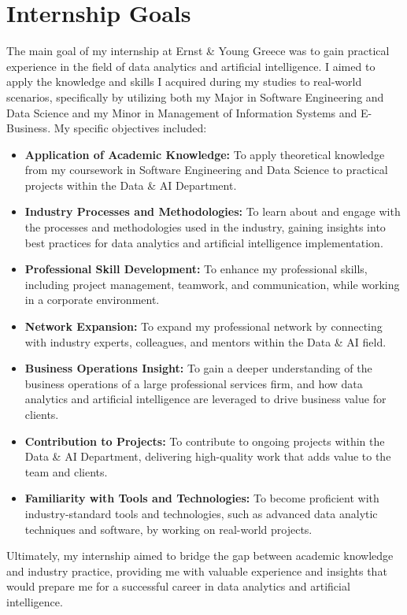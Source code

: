 \section{Internship Goals}

The main goal of my internship at Ernst \& Young Greece was to gain practical
experience in the field of data analytics and artificial intelligence. I aimed
to apply the knowledge and skills I acquired during my studies to real-world
scenarios, specifically by utilizing both my Major in Software Engineering and
Data Science and my Minor in Management of Information Systems and E-Business.
My specific objectives included:

\begin{itemize}
    \item \textbf{Application of Academic Knowledge:} To apply theoretical knowledge from my coursework in Software Engineering and Data Science to practical projects within the Data \& AI Department.
    \item \textbf{Industry Processes and Methodologies:} To learn about and engage with the processes and methodologies used in the industry, gaining insights into best practices for data analytics and artificial intelligence implementation.
    \item \textbf{Professional Skill Development:} To enhance my professional skills, including project management, teamwork, and communication, while working in a corporate environment.
    \item \textbf{Network Expansion:} To expand my professional network by connecting with industry experts, colleagues, and mentors within the Data \& AI field.
    \item \textbf{Business Operations Insight:} To gain a deeper understanding of the business operations of a large professional services firm, and how data analytics and artificial intelligence are leveraged to drive business value for clients.
    \item \textbf{Contribution to Projects:} To contribute to ongoing projects within the Data \& AI Department, delivering high-quality work that adds value to the team and clients.
    \item \textbf{Familiarity with Tools and Technologies:} To become proficient with industry-standard tools and technologies, such as advanced data analytic techniques and software, by working on real-world projects.
\end{itemize}

Ultimately, my internship aimed to bridge the gap between academic knowledge
and industry practice, providing me with valuable experience and insights that
would prepare me for a successful career in data analytics and artificial
intelligence.

